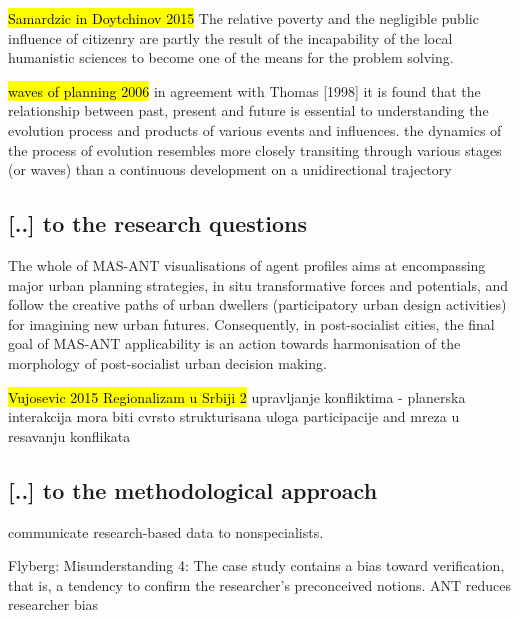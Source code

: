 \documentclass[11pt]{report}
\begin{document}
\hl{Samardzic in Doytchinov 2015} 
The relative poverty and the negligible public influence of citizenry are partly the result of the incapability of the local
humanistic  sciences  to  become  one  of  the  means  for  the  problem  solving. 

\hl{waves of planning 2006}
in  agreement  with  Thomas [1998] it is found that the relationship between past, present and future is essential to understanding  the  evolution  process  and  products  of  various  events  and  influences.
the dynamics of the process  of  evolution  resembles  more  closely  transiting  through  various  stages  (or  waves)
than a continuous development on a unidirectional trajectory

\subsection{[..] to the research questions}

The whole of MAS-ANT visualisations of agent profiles aims at encompassing major urban planning strategies, in situ transformative forces and potentials, and follow the creative paths of urban dwellers (participatory urban design activities) for imagining new urban futures. Consequently, in post-socialist cities, the final goal of MAS-ANT applicability is an action towards harmonisation of the morphology of post-socialist urban decision making.

\hl{Vujosevic 2015 Regionalizam u Srbiji 2}
upravljanje konfliktima - planerska interakcija mora biti cvrsto strukturisana
uloga participacije and mreza u resavanju konflikata

\subsection{[..] to the methodological approach}

communicate research-based data to nonspecialists.

Flyberg: 
Misunderstanding 4: The case study contains a bias toward verification, that is, a tendency to confirm the researcher's preconceived notions.
ANT reduces researcher bias
\end{document}
